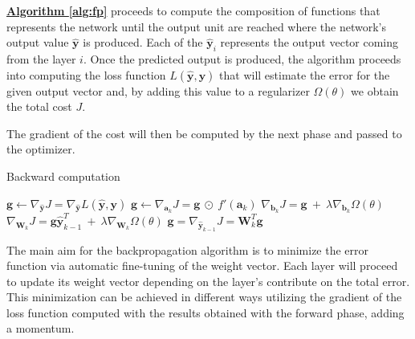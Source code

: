 \hyperref[alg:fp]{\textbf{Algorithm \ref{alg:fp}}} proceeds to compute the composition of functions that represents the network until the output unit are reached where the network's output value ${\hat{\textbf{y}}}$ is produced. Each of the ${\hat{\textbf{y}}}_i$ represents the output vector coming from the layer $\textit{i}$. Once the predicted output is produced, the algorithm proceeds into computing the loss function $L(\mathbf{\hat{\textbf{y}}}, \mathbf{\textbf{y}})$ that will estimate the error for the given output vector and, by adding this value to a regularizer $\Omega(\theta)$ we obtain the total cost $\textit{J}$.\newline

The gradient of the cost will then be computed by the next phase and passed to the optimizer. 

\begin{algorithm}[H]
	\caption{Backward computation}
	\label{alg:bp}
	\begin{algorithmic}[1]
		\State $\mathbf{g} \leftarrow \nabla_{\hat{\mathbf{y}}}J = \nabla_{\hat{\mathbf{y}}}
		L(\mathbf{\hat{y}}, \mathbf{y})$
		\State $\mathbf{g} \leftarrow \nabla_{\mathbf{a}_{k}}J = \mathbf{g} \ \odot \
		f'(\mathbf{a}_{k})$
		\State $\nabla_{\mathbf{b}_{k}}J = \mathbf{g} \ + \ \lambda \nabla_{\mathbf{b}_{k}}
		\Omega(\theta)$
		\State $\nabla_{\mathbf{W}_{k}}J = \mathbf{g}\mathbf{\hat{y}}_{k - 1}^{T} \ + \ \lambda
		\nabla_{\mathbf{W}_{k}} \Omega(\theta)$
		\State $\mathbf{g} = \nabla_{\mathbf{\hat{y}}_{k - 1}}J = \mathbf{W}_{k}^{T}\mathbf{g}$
		\EndFor
		\EndProcedure
	\end{algorithmic}
\end{algorithm}

The main aim for the backpropagation algorithm is to minimize the error function via automatic fine-tuning of the weight vector. Each layer will proceed to update its weight vector depending on the layer's contribute on the total error. This minimization can be achieved in different ways utilizing the gradient of the loss function computed with the results obtained with the forward phase, adding a momentum.\newline

